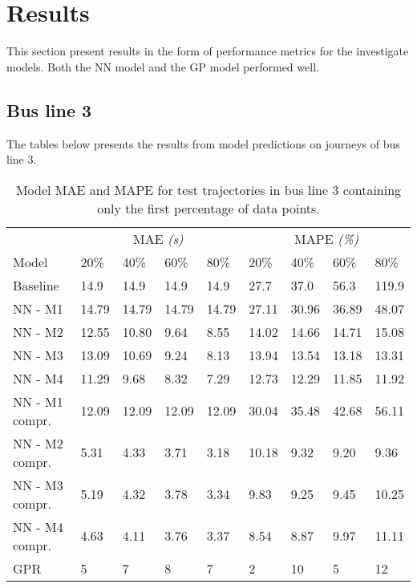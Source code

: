 
\captionsetup{width=.75\textwidth}


\chapter{Results}
\label{cha:results}
This section present results in the form of performance metrics for the investigate models. Both the NN model and the GP model performed well.

\section{Bus line 3}
The tables below presents the results from model predictions on journeys of bus line 3.
\begin{table}[H]
  \centering
  \caption{Model MAE and MAPE for test trajectories in bus line 3 containing only the first percentage of data points.}
  \label{tbl:models-mae-and-mape-203}
  \begin{tabular}{l | l | l | l | l || l | l | l | l }
    & \multicolumn{4}{c}{MAE \textit{(s)}} & \multicolumn{4}{c}{MAPE \textit{(\%)}} \\
    Model      & 20\% & 40\% & 60\% & 80\% & 20\% & 40\% & 60\% & 80\% \\
    \hline
    Baseline & 14.9 & 14.9 & 14.9 & 14.9  & 27.7 & 37.0 & 56.3 & 119.9 \\
    NN - M1        & 14.79 &  14.79 & 14.79 &  14.79  & 27.11 & 30.96 & 36.89 & 48.07 \\
    NN - M2        & 12.55 &  10.80 & 9.64 &  8.55  & 14.02 & 14.66 & 14.71 & 15.08 \\
    NN - M3        & 13.09 &  10.69 & 9.24 &  8.13  & 13.94 & 13.54 & 13.18 & 13.31 \\
    NN - M4        & 11.29 &  9.68 & 8.32 &  7.29  & 12.73 & 12.29 & 11.85 & 11.92 \\
    NN - M1 compr.        & 12.09 &  12.09 & 12.09 &  12.09  & 30.04 & 35.48 & 42.68 & 56.11 \\
    NN - M2 compr.       & 5.31 &  4.33 & 3.71 &  3.18  & 10.18 & 9.32 & 9.20 & 9.36 \\
    NN - M3 compr.       & 5.19 &  4.32 & 3.78 &  3.34  & 9.83 & 9.25 & 9.45 & 10.25 \\
    NN - M4 compr.       & 4.63 &  4.11 & 3.76 &  3.37  & 8.54 & 8.87 & 9.97 & 11.11 \\
    GPR        & 5 &  7 & 8 &  7  & 2 & 10 & 5 & 12 \\
  \end{tabular}
\end{table}

